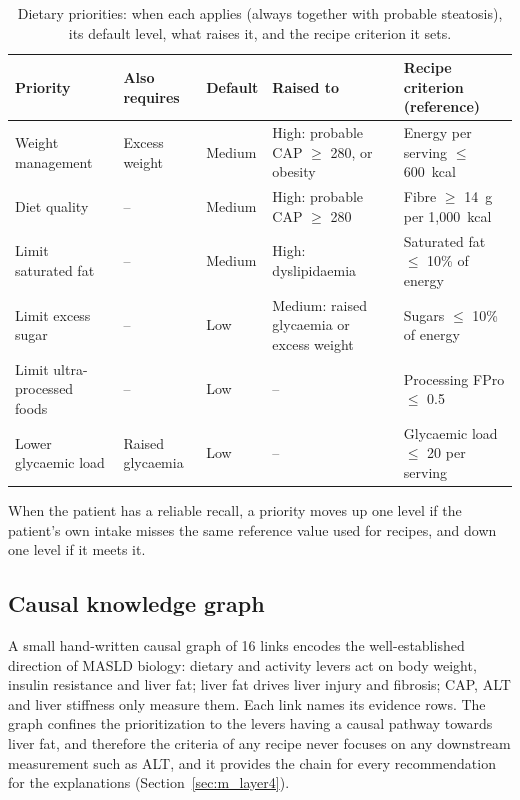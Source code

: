 \begin{table}[htbp]
\centering
\caption{Dietary priorities: when each applies (always together with probable steatosis), its default level, what raises it, and the recipe criterion it sets.}
\label{tab:m_priorities}
\begin{tabular}{p{2.6cm}p{2.4cm}p{1.3cm}p{3.8cm}p{3.6cm}}
\toprule
Priority & Also requires & Default & Raised to & Recipe criterion (reference) \\
\midrule
Weight management & Excess weight & Medium & High: probable CAP $\geq$ 280, or obesity & Energy per serving $\leq$ 600~kcal \\
Diet quality & -- & Medium & High: probable CAP $\geq$ 280 & Fibre $\geq$ 14~g per 1{,}000~kcal \\
Limit saturated fat & -- & Medium & High: dyslipidaemia & Saturated fat $\leq$ 10\% of energy \\
Limit excess sugar & -- & Low & Medium: raised glycaemia or excess weight & Sugars $\leq$ 10\% of energy \\
Limit ultra-processed foods & -- & Low & -- & Processing FPro $\leq$ 0.5 \\
Lower glycaemic load & Raised glycaemia & Low & -- & Glycaemic load $\leq$ 20 per serving \\
\bottomrule
\end{tabular}
\end{table}

When the patient has a reliable recall, a priority moves up one level if the
patient's own intake misses the same reference value used for recipes, and
down one level if it meets it.

\subsection{Causal knowledge graph}

A small hand-written causal graph of 16 links encodes the well-established
direction of MASLD biology: dietary and activity levers act on body weight,
insulin resistance and liver fat; liver fat drives liver injury and fibrosis;
CAP, ALT and liver stiffness only measure them. Each link names its evidence
rows. The graph confines the prioritization to the levers having a causal pathway 
towards liver fat, and therefore the criteria of any recipe never focuses on any downstream 
measurement such as ALT, and it provides the chain for every recommendation for the 
explanations (Section~\ref{sec:m_layer4}).

